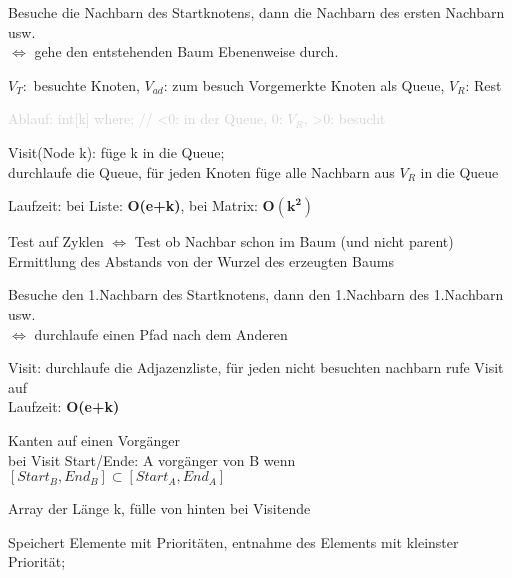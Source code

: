 Besuche die Nachbarn des Startknotens, dann die Nachbarn des ersten Nachbarn usw.\\
$\Leftrightarrow$ gehe den entstehenden Baum Ebenenweise durch.

$V_T:$ besuchte Knoten, $V_{ad}$: zum besuch Vorgemerkte Knoten als Queue, $V_R$: Rest

\textcolor{lightgray}{Ablauf: int[k] where; // <0: in der Queue, 0: $V_R$, >0: besucht }%

Visit(Node k): füge k in die Queue;\\
durchlaufe die Queue, für jeden Knoten füge alle Nachbarn aus $V_R$ in die Queue

Laufzeit: bei Liste:\textbf{ O(e+k)}, bei Matrix: $\mathbf{O(k^2)}$

 Test auf Zyklen $\Leftrightarrow$ Test ob Nachbar schon im Baum (und nicht parent)\\
Ermittlung des Abstands von der Wurzel des erzeugten Baums

Besuche den 1.Nachbarn des Startknotens, dann den 1.Nachbarn des 1.Nachbarn usw.\\
$\Leftrightarrow$ durchlaufe einen Pfad nach dem Anderen

Visit: durchlaufe die Adjazenzliste, für jeden nicht besuchten nachbarn rufe Visit auf\\
Laufzeit: \textbf{O(e+k)}


 Kanten auf einen Vorgänger\\
bei Visit Start/Ende: A vorgänger von B wenn $[Start_B,End_B] \subset  [Start_A,End_A]$

 Array der Länge k, fülle von hinten bei Visitende\\


Speichert Elemente mit Prioritäten, entnahme des Elements mit kleinster Priorität;
 
